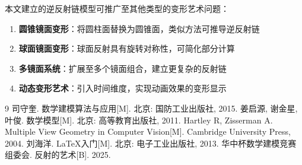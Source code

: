 \documentclass[withoutpreface]{cumcmthesis}
\begin{document}
本文建立的逆反射链模型可推广至其他类型的变形艺术问题：
\begin{enumerate}
    \item \textbf{圆锥镜面变形}：将圆柱面替换为圆锥面，类似方法可推导逆反射链
    \item \textbf{球面镜面变形}：球面反射具有旋转对称性，可简化部分计算
    \item \textbf{多镜面系统}：扩展至多个镜面组合，建立更复杂的反射链
    \item \textbf{动态变形艺术}：引入时间维度，实现动画效果的变形显示
\end{enumerate}

\begin{thebibliography}{9}
 司守奎. 数学建模算法与应用[M]. 北京: 国防工业出版社, 2015.
 姜启源, 谢金星, 叶俊. 数学模型[M]. 北京: 高等教育出版社, 2011.
 Hartley R, Zisserman A. Multiple View Geometry in Computer Vision[M]. Cambridge University Press, 2004.
 刘海洋. \LaTeX{}入门[M]. 北京: 电子工业出版社, 2013.
 华中杯数学建模竞赛组委会. 反射的艺术[B]. 2025.
\end{thebibliography}
\end{document}
